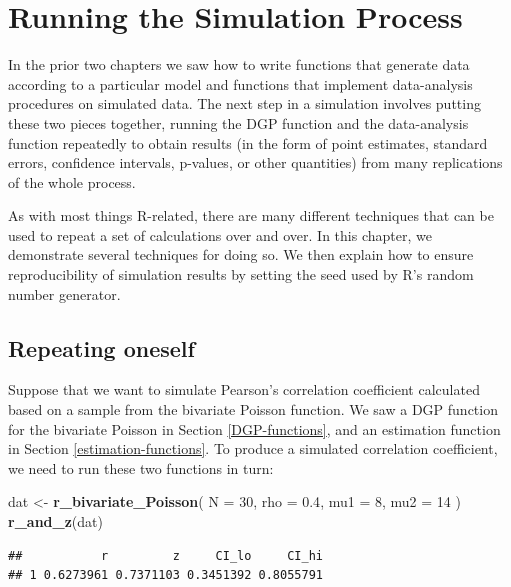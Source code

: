 \documentclass[
]{book}
\newenvironment{Shaded}{\begin{snugshade}}{\end{snugshade}}
\newcommand{\AttributeTok}[1]{\textcolor[rgb]{0.13,0.29,0.53}{#1}}
\newcommand{\DecValTok}[1]{\textcolor[rgb]{0.00,0.00,0.81}{#1}}
\newcommand{\FloatTok}[1]{\textcolor[rgb]{0.00,0.00,0.81}{#1}}
\newcommand{\FunctionTok}[1]{\textcolor[rgb]{0.13,0.29,0.53}{\textbf{#1}}}
\newcommand{\NormalTok}[1]{#1}
\newcommand{\OtherTok}[1]{\textcolor[rgb]{0.56,0.35,0.01}{#1}}
\begin{document}
\chapter{Running the Simulation Process}\label{running-the-simulation-process}

In the prior two chapters we saw how to write functions that generate data according to a particular model and functions that implement data-analysis procedures on simulated data.
The next step in a simulation involves putting these two pieces together, running the DGP function and the data-analysis function repeatedly to obtain results (in the form of point estimates, standard errors, confidence intervals, p-values, or other quantities) from many replications of the whole process.

As with most things R-related, there are many different techniques that can be used to repeat a set of calculations over and over.
In this chapter, we demonstrate several techniques for doing so.
We then explain how to ensure reproducibility of simulation results by setting the seed used by R's random number generator.

\section{Repeating oneself}\label{repeating-oneself}

Suppose that we want to simulate Pearson's correlation coefficient calculated based on a sample from the bivariate Poisson function.
We saw a DGP function for the bivariate Poisson in Section \ref{DGP-functions}, and an estimation function in Section \ref{estimation-functions}.
To produce a simulated correlation coefficient, we need to run these two functions in turn:

\begin{Shaded}
\begin{Highlighting}[]
\NormalTok{dat }\OtherTok{\textless{}{-}} \FunctionTok{r\_bivariate\_Poisson}\NormalTok{( }\AttributeTok{N =} \DecValTok{30}\NormalTok{, }\AttributeTok{rho =} \FloatTok{0.4}\NormalTok{, }\AttributeTok{mu1 =} \DecValTok{8}\NormalTok{, }\AttributeTok{mu2 =} \DecValTok{14}\NormalTok{ )}
\FunctionTok{r\_and\_z}\NormalTok{(dat)}
\end{Highlighting}
\end{Shaded}

\begin{verbatim}
##           r         z     CI_lo     CI_hi
## 1 0.6273961 0.7371103 0.3451392 0.8055791
\end{verbatim}
\end{document}
